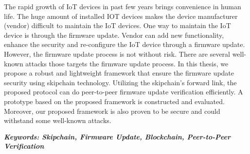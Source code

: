 The rapid growth of IoT devices in past few years brings convenience in human life. The huge amount of installed IOT devices makes the device manufacturer (vendor) difficult to maintain the IoT devices. One way to maintain the IoT device is through the firmware update. Vendor can add new functionality, enhance the security and re-configure the IoT device through a firmware update. However, the firmware update process is not without risk. There are several well-known attacks those targets the firmware update process. In this thesis, we propose a robust and lightweight framework that ensure the firmware update security using skipchain technology. Utilizing the skipchain's forward link, the proposed protocol can do peer-to-peer firmware update verification efficiently. A prototype based on the proposed framework is constructed and evaluated. Moreover, our proposed framework is also proven to be secure and could withstand some well-known attacks.

\textit{\textbf{Keywords: Skipchain, Firmware Update, Blockchain, Peer-to-Peer Verification}}
